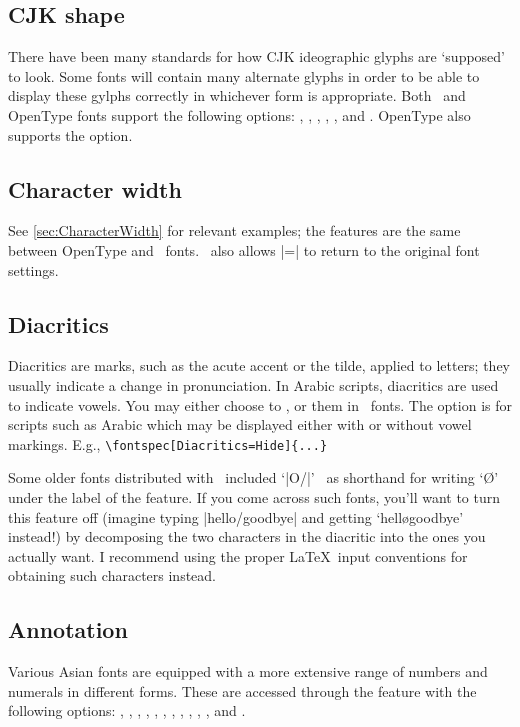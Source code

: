 \documentclass[a4paper]{l3doc}
\begin{document}
\subsection{CJK shape}
There have been many standards for how CJK ideographic
glyphs are `supposed' to look. Some fonts will contain many alternate
glyphs in order to be able to display these gylphs
correctly in whichever form is appropriate. Both \AAT\ and OpenType
fonts support the following  options:
, , , ,
, and . OpenType also supports the  option.

\subsection{Character width}
See \vref{sec:CharacterWidth} for relevant examples; the features are
the same between OpenType and \AAT\ fonts.
\AAT\ also allows |=| to return to
the original font settings.

\subsection{Diacritics}
Diacritics are marks, such as the acute accent or the tilde, applied to letters; they usually indicate a change in pronunciation.
In Arabic scripts, diacritics are used to indicate vowels.
You may either choose
to ,  or  them in \AAT\ fonts.
The  option is for scripts such as Arabic which may be
displayed either with or without vowel markings. E.g.,
\verb|\fontspec[Diacritics=Hide]{...}|

Some older fonts distributed with \MacOSX\ included `|O/|' \etc\ as shorthand for writing `\O' under the label of the  feature. If you come across such fonts, you'll
want to turn this feature off (imagine typing |hello/goodbye| and
getting `hell\o goodbye' instead!) by decomposing the two characters
in the diacritic into the ones you actually
want. I recommend using
the proper \LaTeX\ input conventions for obtaining such characters
instead.


\subsection{Annotation}
Various Asian fonts are equipped with a more extensive range of
numbers and numerals in different forms. These are accessed through
the  feature with the following
options: ,
, , , ,
, , , ,
, , and .
\end{document}
